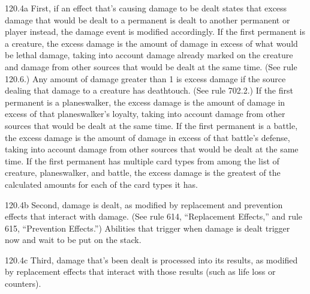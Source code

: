 120.4a First, if an effect that’s causing damage to be dealt states that excess damage that would be dealt to a permanent is dealt to another permanent or player instead, the damage event is modified accordingly. If the first permanent is a creature, the excess damage is the amount of damage in excess of what would be lethal damage, taking into account damage already marked on the creature and damage from other sources that would be dealt at the same time. (See rule 120.6.) Any amount of damage greater than 1 is excess damage if the source dealing that damage to a creature has deathtouch. (See rule 702.2.) If the first permanent is a planeswalker, the excess damage is the amount of damage in excess of that planeswalker’s loyalty, taking into account damage from other sources that would be dealt at the same time. If the first permanent is a battle, the excess damage is the amount of damage in excess of that battle’s defense, taking into account damage from other sources that would be dealt at the same time. If the first permanent has multiple card types from among the list of creature, planeswalker, and battle, the excess damage is the greatest of the calculated amounts for each of the card types it has.

120.4b Second, damage is dealt, as modified by replacement and prevention effects that interact with damage. (See rule 614, “Replacement Effects,” and rule 615, “Prevention Effects.”) Abilities that trigger when damage is dealt trigger now and wait to be put on the stack.

120.4c Third, damage that’s been dealt is processed into its results, as modified by replacement effects that interact with those results (such as life loss or counters).

